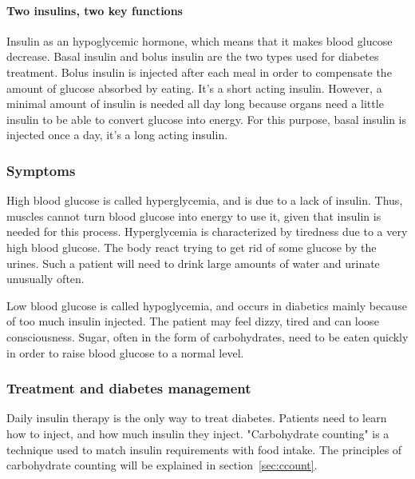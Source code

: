 \paragraph{Two insulins, two key functions}
Insulin as an hypoglycemic hormone, which means that it makes blood glucose decrease. 
Basal insulin and bolus insulin are the two types used for diabetes treatment. Bolus insulin is injected after each meal in order to compensate the amount of glucose absorbed by eating. It's a short acting insulin. However, a minimal amount of insulin is needed all day long because organs need a little insulin to be able to convert glucose into energy. For this purpose, basal insulin is injected once a day, it's a long acting insulin. 

\subsubsection{Symptoms}
High blood glucose is called hyperglycemia, and is due to a lack of insulin. Thus, muscles cannot turn blood glucose into energy to use it, given that insulin is needed for this process. Hyperglycemia is characterized by %
tiredness due to a very high blood glucose. The body react trying to get rid of some glucose by the urines. Such a patient will need to drink large amounts of water and urinate unusually often. 

Low blood glucose is called hypoglycemia, and occurs in diabetics mainly because of too much insulin injected. The patient may feel dizzy, tired and can loose consciousness. Sugar, often in the form of carbohydrates, need to be eaten quickly in order to raise blood glucose to a normal level.  

\subsubsection{Treatment and diabetes management}
Daily insulin therapy is the only way to treat diabetes. Patients need to learn how to inject, and how much insulin they inject. "Carbohydrate counting" is a technique used to match insulin requirements with food intake. The principles of carbohydrate counting will be explained in section~\ref{sec:ccount}.

